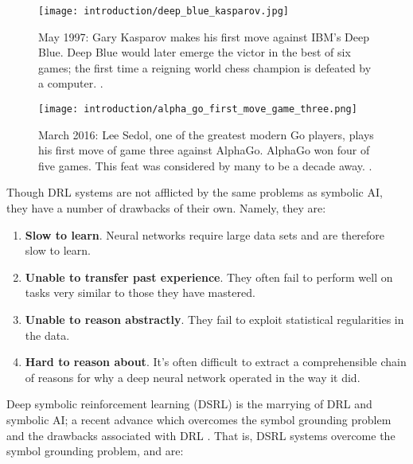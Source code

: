 \begin{figure}[h!]
\centering
\begin{minipage}{.45\textwidth}
  \centering
\texttt{[image: introduction/deep\_blue\_kasparov.jpg]}
  \caption{May 1997: Gary Kasparov makes his first move against IBM's Deep Blue. Deep Blue would later emerge the victor in the best of six games; the first time a reigning world chess champion is defeated by a computer. \cite{Rosen2012}.}
  \label{fig:deep_blue_kasparov}
\end{minipage}%
  \hfill
\begin{minipage}{.45\textwidth}
  \centering
\texttt{[image: introduction/alpha\_go\_first\_move\_game\_three.png]}
  \caption{March 2016: Lee Sedol, one of the greatest modern Go players, plays his first move of game three against AlphaGo. AlphaGo won four of five games. This feat was considered by many to be a decade away. \cite{Ormerod2016}.}
  \label{fig:alpha_go_first_move_game_three}
\end{minipage}
\end{figure}

Though DRL systems are not afflicted by the same problems as symbolic AI, they have a number of drawbacks of their own. Namely, they are: \cite{Garnelo2016}

\begin{enumerate}
\item \textbf{Slow to learn}. Neural networks require large data sets and are therefore
slow to learn.
\item \textbf{Unable to transfer past experience}. They often fail to perform well on tasks very
similar to those they have mastered.
\item \textbf{Unable to reason abstractly}. They fail to exploit statistical regularities in the data.
\item \textbf{Hard to reason about}. It's often difficult to extract a comprehensible chain of reasons for why a deep neural network operated in the way it did.
\end{enumerate}

Deep symbolic reinforcement learning (DSRL) is the marrying of DRL and symbolic AI; a recent advance which overcomes the symbol grounding problem and the drawbacks associated with DRL \cite{Garnelo2016}. That is, DSRL systems overcome the symbol grounding problem, and are:

